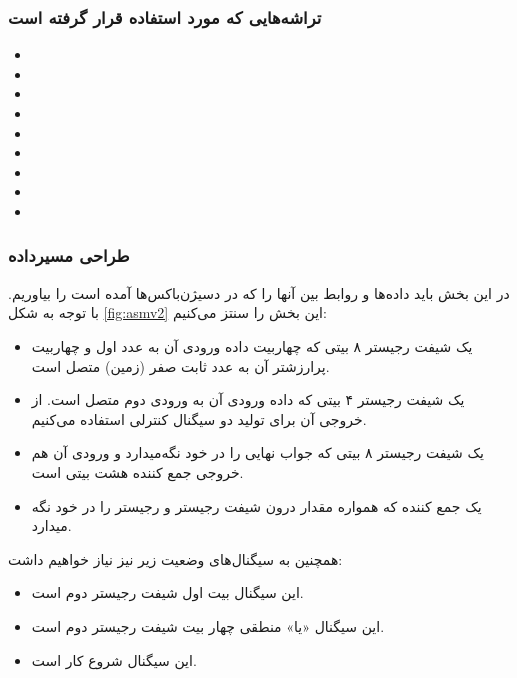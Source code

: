 \documentclass{article}
\begin{document}
\subsubsection{تراشه‌هایی که مورد استفاده قرار گرفته است}
\label{chips}
\begin{itemize}
\item[\lr{74283}]

\item[\lr{74194}]

\item[\lr{74198}]

\item[\lr{7474}]

\item[\lr{2732}]

\item[\lr{}]

\item[\lr{}]

\item[\lr{}]

\item[\lr{}]
\end{itemize}

\subsubsection{طراحی مسیرداده}
در این بخش باید داده‌ها و روابط بین آنها را که در دسیژن‌باکس‌ها آمده است را بیاوریم. با توجه به شکل \ref{fig:asmv2} این بخش را سنتز می‌کنیم:

\begin{itemize}
\item[\lr{A}]
یک شیفت رجیستر ۸ بیتی که چهاربیت داده ورودی آن به عدد اول و چهاربیت پرارزشتر آن به عدد ثابت صفر (زمین) متصل است.
\item[\lr{B}]
یک شیفت رجیستر ۴ بیتی که داده ورودی آن به ورودی دوم متصل است. از خروجی آن برای تولید دو سیگنال کنترلی استفاده می‌کنیم.
\item[\lr{C}]
یک شیفت رجیستر ۸ بیتی که جواب نهایی را در خود نگه‌میدارد و ورودی آن هم خروجی جمع کننده هشت بیتی است.
\item
یک جمع کننده که همواره مقدار درون شیفت رجیستر  و رجیستر  را در خود نگه میدارد.

\end{itemize}

همچنین به سیگنال‌های وضعیت زیر نیز نیاز خواهیم داشت:

\begin{itemize}
\item[\lr{B0}]
این سیگنال بیت اول شیفت رجیستر دوم است.
\item[\lr{ORB}]
این سیگنال «یا» منطقی چهار بیت شیفت رجیستر دوم است.
\item[\lr{S}]
این سیگنال شروع کار است.
\end{itemize}
\end{document}
